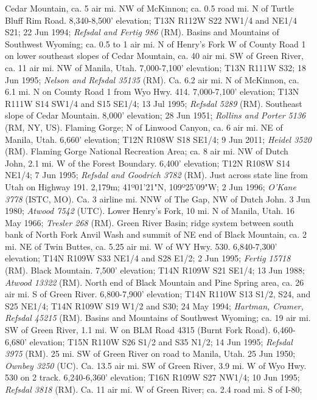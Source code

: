 Cedar Mountain, ca. 5 air mi. NW of McKinnon; ca. 0.5 road mi. N of Turtle Bluff
Rim Road. 8,340-8,500' elevation; T13N R112W S22 NW1/4 and NE1/4 S21;
22 Jun 1994; \textit{Refsdal and Fertig 986} (RM).
Basins and Mountains of Southwest Wyoming; ca. 0.5 to 1 air mi. N of Henry's
Fork W of County Road 1 on lower southeast slopes of Cedar Mountain, ca. 40 air
mi. SW of Green River, ca. 11 air mi. NW of Manila, Utah. 7,000-7,100' elevation;
T13N R111W S32; 18 Jun 1995; \textit{Nelson and Refsdal 35135} (RM).
Ca. 6.2 air mi. N of McKinnon, ca. 6.1 mi. N on County Road 1 from Wyo Hwy. 414.
7,000-7,100' elevation; T13N R111W S14 SW1/4 and S15 SE1/4; 13 Jul 1995;
\textit{Refsdal 5289} (RM).
Southeast slope of Cedar Mountain. 8,000' elevation; 28 Jun 1951;
\textit{Rollins and Porter 5136} (RM, NY, US).
Flaming Gorge; N of Linwood Canyon, ca. 6 air mi. NE of Manila, Utah. 6,660'
elevation; T12N R108W S18 SE1/4; 9 Jun 2011; \textit{Heidel 3520} (RM).
Flaming Gorge National Recreation Area; ca. 8 air mi. NW of Dutch John, 2.1 mi.
W of the Forest Boundary. 6,400' elevation; T12N R108W S14 NE1/4; 7 Jun 1995;
\textit{Refsdal and Goodrich 3782} (RM).
Just across state line from Utah on Highway 191. 2,179m; 41º01'21"N, 109º25'09"W;
2 Jun 1996; \textit{O'Kane 3778} (ISTC, MO).
Ca. 3 airline mi. NNW of The Gap, NW of Dutch John.	3 Jun 1980;
\textit{Atwood 7542} (UTC).
Lower Henry's Fork, 10 mi. N of Manila, Utah. 16 May 1966;
\textit{Tresler 268} (RM).
Green River Basin; ridge system between south bank of North Fork Anvil Wash and
summit of NE end of Black Mountain, ca. 2 mi. NE of Twin Buttes, ca. 5.25 air mi.
W of WY Hwy. 530.  6,840-7,300' elevation; T14N R109W S33 NE1/4 and S28 E1/2;
2 Jun 1995; \textit{Fertig 15718} (RM).
Black Mountain. 7,500' elevation; T14N R109W S21 SE1/4; 13 Jun 1988;
\textit{Atwood 13322} (RM).
North end of Black Mountain and Pine Spring area, ca. 26 air mi. S of Green
River. 6,800-7,900' elevation; T14N R110W S13 S1/2, S24, and S25 NE1/4;
T14N R109W S19 W1/2 and S30; 24 May 1994;
\textit{Hartman, Cramer, Refsdal 45215} (RM).
Basins and Mountains of Southwest Wyoming; ca. 19 air mi. SW of Green River, 1.1
mi. W on BLM Road 4315 (Burnt Fork Road). 6,460-6,680' elevation;
T15N R110W S26 S1/2 and S35 N1/2; 14 Jun 1995; \textit{Refsdal 3975} (RM).
25 mi. SW of Green River on road to Manila, Utah. 25 Jun 1950;
\textit{Ownbey 3250} (UC).
Ca. 13.5 air mi. SW of Green River, 3.9 mi. W of Wyo Hwy. 530 on 2 track.
6,240-6,360' elevation; T16N R109W S27 NW1/4; 10 Jun 1995;
\textit{Refsdal 3818} (RM).
Ca. 11 air mi. W of Green River; ca. 2.4 road mi. S of I-80;
